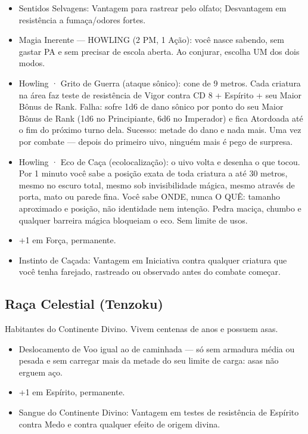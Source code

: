\begin{itemize}
  \item Sentidos Selvagens: Vantagem para rastrear pelo olfato; Desvantagem em resistência a fumaça/odores fortes.
  \item Magia Inerente --- HOWLING (2 PM, 1 Ação): você nasce sabendo, sem gastar PA e sem precisar de escola aberta. Ao conjurar, escolha UM dos dois modos.
  \item Howling · Grito de Guerra (ataque sônico): cone de 9 metros. Cada criatura na área faz teste de resistência de Vigor contra CD 8 + Espírito + seu Maior Bônus de Rank. Falha: sofre 1d6 de dano sônico por ponto do seu Maior Bônus de Rank (1d6 no Principiante, 6d6 no Imperador) e fica Atordoada até o fim do próximo turno dela. Sucesso: metade do dano e nada mais. Uma vez por combate --- depois do primeiro uivo, ninguém mais é pego de surpresa.
  \item Howling · Eco de Caça (ecolocalização): o uivo volta e desenha o que tocou. Por 1 minuto você sabe a posição exata de toda criatura a até 30 metros, mesmo no escuro total, mesmo sob invisibilidade mágica, mesmo através de porta, mato ou parede fina. Você sabe ONDE, nunca O QUÊ: tamanho aproximado e posição, não identidade nem intenção. Pedra maciça, chumbo e qualquer barreira mágica bloqueiam o eco. Sem limite de usos.
  \item +1 em Força, permanente.
  \item Instinto de Caçada: Vantagem em Iniciativa contra qualquer criatura que você tenha farejado, rastreado ou observado antes do combate começar.
\end{itemize}

\subsection{Raça Celestial (Tenzoku)}
Habitantes do Continente Divino. Vivem centenas de anos e possuem asas.

\begin{itemize}
  \item Deslocamento de Voo igual ao de caminhada --- só sem armadura média ou pesada e sem carregar mais da metade do seu limite de carga: asas não erguem aço.
  \item +1 em Espírito, permanente.
  \item Sangue do Continente Divino: Vantagem em testes de resistência de Espírito contra Medo e contra qualquer efeito de origem divina.
\end{itemize}

